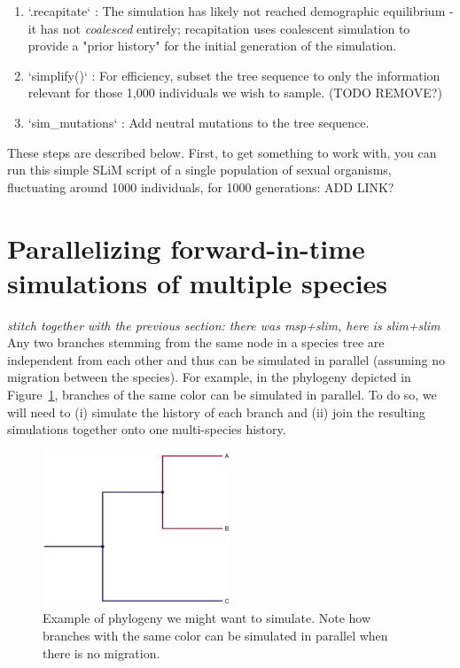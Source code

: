\documentclass[12pt]{article}
\newcommand{\comment}[1]{\textit{\color{green} #1}}
\begin{document}
\begin{enumerate}
    \item `.recapitate` :
       The simulation has likely not reached demographic equilibrium - it has not
        \textit{coalesced} entirely; recapitation uses coalescent simulation to provide
       a "prior history" for the initial generation of the simulation.

    \item `simplify()` : For efficiency, subset the tree
       sequence to only the information relevant for those 1,000 individuals
        we wish to sample. (TODO REMOVE?)

    \item `sim\_mutations` : Add neutral mutations to the tree sequence.
\end{enumerate}

These steps are described below. First, to get something to work with,
you can run this simple SLiM script of a single population of sexual organisms,
fluctuating around 1000 individuals, for 1000 generations: ADD LINK?


\section*{Parallelizing forward-in-time simulations of multiple species}
\comment{stitch together with the previous section: there was msp+slim, here is slim+slim}
Any two branches stemming from the same node in a species tree are independent from each other and
thus can be simulated in parallel (assuming no migration between the species).
For example, in the phylogeny depicted in Figure~\ref{fig:phylo},
branches of the same color can be simulated in parallel.
To do so, we will need to
(i) simulate the history of each branch and
(ii) join the resulting simulations together onto one multi-species history.

 \begin{figure}[h!]
 \centering
  \includegraphics[width=0.5\textwidth]{./code/parallelizing_phylogeny/phylo.pdf}
  \caption{Example of phylogeny we might want to simulate. Note how branches with the same color can be simulated in parallel when there is no migration.}
  \label{fig:phylo}
 \end{figure}
\end{document}
